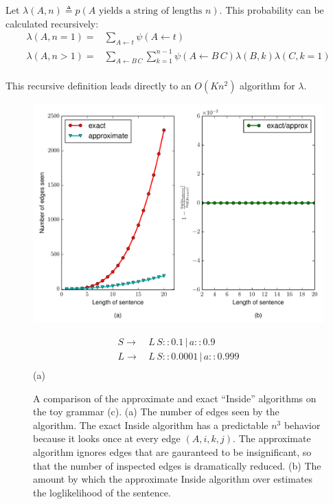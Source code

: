 \documentclass{article}
\begin{document}
Let $\lambda(A, n) \triangleq p(A \text{ yields a string of lengths }
n)$. This probability can be calculated recursively: 
\begin{align}
\lambda(A, n=1) =& \sum_{A \leftarrow t} \psi(A \leftarrow t)\\ 
\lambda(A, n>1) =& \sum_{A \leftarrow B \,C} \sum_{k=1}^{n-1} \psi(A \leftarrow B\, C) 
  \lambda(B, k) \lambda(C, k=1)\\ 
\end{align}

This recursive definition leads directly to an $O(Kn^2)$ algorithm for
$\lambda$. 

\begin{figure}
\begin{minipage}[t]{\textwidth}
  \includegraphics[width=\linewidth]{figures/toy_grammar_approx_vs_exact.pdf}
\end{minipage}
\begin{minipage}[t]{4cm}
  \begin{align*}
    S \rightarrow& \,L\, S :: 0.1 \, | \,a :: 0.9\\
    L \rightarrow& \,L\, S :: 0.0001\, | \, a :: 0.999\\
  \end{align*}
  \centering (a)\par
\end{minipage}

\begin{minipage}[t]{\textwidth}
  \caption{A comparison of the approximate and exact ``Inside''
    algorithms on the toy grammar (c). (a) The number of edges seen by
    the algorithm. The exact Inside algorithm has a predictable $n^3$
    behavior because it looks once at every edge $(A, i, k, j)$. The
    approximate algorithm ignores edges that are gauranteed to be
    insignificant, so that the number of inspected edges is
    dramatically reduced. (b) The amount by which the approximate
    Inside algorithm over estimates the loglikelihood of the
    sentence. }
\end{minipage}
\end{figure}
\end{document}
